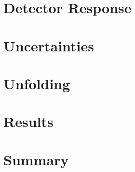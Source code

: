 




\section{Detector Response}



























\section{Uncertainties}




\section{Unfolding}



\section{Results}



\section{Summary}

